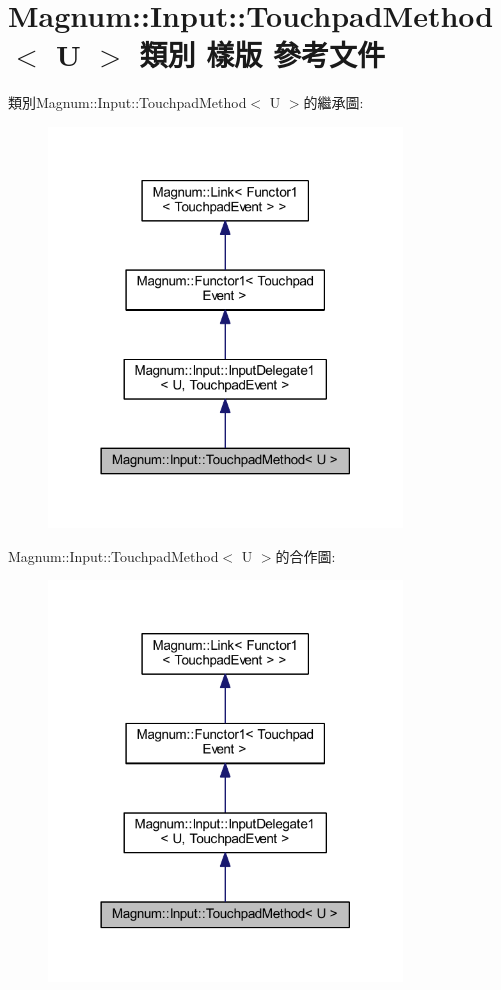 \hypertarget{class_magnum_1_1_input_1_1_touchpad_method}{}\section{Magnum\+:\+:Input\+:\+:Touchpad\+Method$<$ U $>$ 類別 樣版 參考文件}
\label{class_magnum_1_1_input_1_1_touchpad_method}


類別\+Magnum\+:\+:Input\+:\+:Touchpad\+Method$<$ U $>$的繼承圖\+:\nopagebreak
\begin{figure}[H]
\begin{center}
\leavevmode
\includegraphics[width=266pt]{class_magnum_1_1_input_1_1_touchpad_method__inherit__graph}
\end{center}
\end{figure}


Magnum\+:\+:Input\+:\+:Touchpad\+Method$<$ U $>$的合作圖\+:\nopagebreak
\begin{figure}[H]
\begin{center}
\leavevmode
\includegraphics[width=266pt]{class_magnum_1_1_input_1_1_touchpad_method__coll__graph}
\end{center}
\end{figure}

